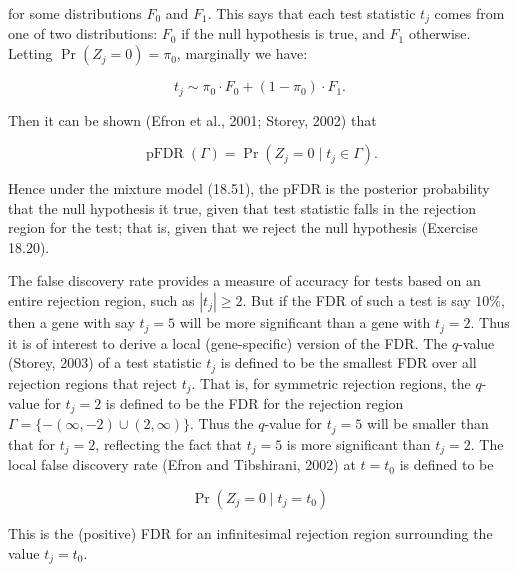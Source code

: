 \documentclass[10pt]{article}
\begin{document}
for some distributions $F_{0}$ and $F_{1}$. This says that each test statistic $t_{j}$ comes from one of two distributions: $F_{0}$ if the null hypothesis is true, and $F_{1}$ otherwise. Letting $\operatorname{Pr}\left(Z_{j}=0\right)=\pi_{0}$, marginally we have:


\begin{equation*}
t_{j} \sim \pi_{0} \cdot F_{0}+\left(1-\pi_{0}\right) \cdot F_{1} . \tag{18.52}
\end{equation*}


Then it can be shown (Efron et al., 2001; Storey, 2002) that


\begin{equation*}
\operatorname{pFDR}(\Gamma)=\operatorname{Pr}\left(Z_{j}=0 \mid t_{j} \in \Gamma\right) . \tag{18.53}
\end{equation*}


Hence under the mixture model (18.51), the pFDR is the posterior probability that the null hypothesis it true, given that test statistic falls in the rejection region for the test; that is, given that we reject the null hypothesis (Exercise 18.20).

The false discovery rate provides a measure of accuracy for tests based on an entire rejection region, such as $\left|t_{j}\right| \geq 2$. But if the FDR of such a test is say $10 \%$, then a gene with say $t_{j}=5$ will be more significant than a gene with $t_{j}=2$. Thus it is of interest to derive a local (gene-specific) version of the FDR. The $q$-value (Storey, 2003) of a test statistic $t_{j}$ is defined to be the smallest FDR over all rejection regions that reject $t_{j}$. That is, for symmetric rejection regions, the $q$-value for $t_{j}=2$ is defined to be the FDR for the rejection region $\Gamma=\{-(\infty,-2) \cup(2, \infty)\}$. Thus the $q$-value for $t_{j}=5$ will be smaller than that for $t_{j}=2$, reflecting the fact that $t_{j}=5$ is more significant than $t_{j}=2$. The local false discovery rate (Efron and Tibshirani, 2002) at $t=t_{0}$ is defined to be


\begin{equation*}
\operatorname{Pr}\left(Z_{j}=0 \mid t_{j}=t_{0}\right) \tag{18.54}
\end{equation*}


This is the (positive) FDR for an infinitesimal rejection region surrounding the value $t_{j}=t_{0}$.
\end{document}
